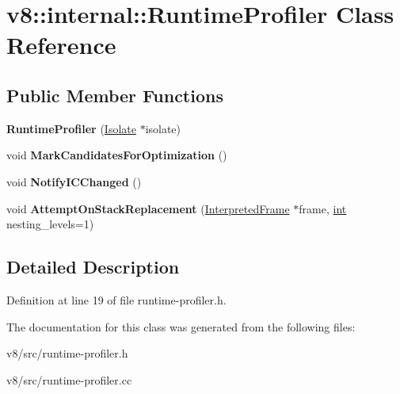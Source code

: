 \hypertarget{classv8_1_1internal_1_1RuntimeProfiler}{}\section{v8\+:\+:internal\+:\+:Runtime\+Profiler Class Reference}
\label{classv8_1_1internal_1_1RuntimeProfiler}
\subsection*{Public Member Functions}
\begin{DoxyCompactItemize}
\item 
\mbox{\label{classv8_1_1internal_1_1RuntimeProfiler_a1953dfce58c78e2f4c9e136b08cbfa8d}} 
{\bfseries Runtime\+Profiler} (\mbox{\hyperlink{classv8_1_1internal_1_1Isolate}{Isolate}} $\ast$isolate)
\item 
\mbox{\label{classv8_1_1internal_1_1RuntimeProfiler_a9b971bcdc311199571e8b9ce2e9ee3e6}} 
void {\bfseries Mark\+Candidates\+For\+Optimization} ()
\item 
\mbox{\label{classv8_1_1internal_1_1RuntimeProfiler_a9b44870acbaf140a44bb8261a055d592}} 
void {\bfseries Notify\+I\+C\+Changed} ()
\item 
\mbox{\label{classv8_1_1internal_1_1RuntimeProfiler_a80a5c3027ba6985b63ead7aca15584e1}} 
void {\bfseries Attempt\+On\+Stack\+Replacement} (\mbox{\hyperlink{classv8_1_1internal_1_1InterpretedFrame}{Interpreted\+Frame}} $\ast$frame, \mbox{\hyperlink{classint}{int}} nesting\+\_\+levels=1)
\end{DoxyCompactItemize}


\subsection{Detailed Description}


Definition at line 19 of file runtime-\/profiler.\+h.



The documentation for this class was generated from the following files\+:\begin{DoxyCompactItemize}
\item 
v8/src/runtime-\/profiler.\+h\item 
v8/src/runtime-\/profiler.\+cc\end{DoxyCompactItemize}
